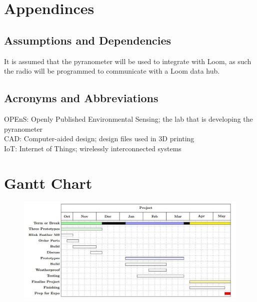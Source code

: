\documentclass[10pt,draftclsnofoot,onecolumn,letterpaper]{article}
\begin{document}
\section{Appendinces}
\subsection{Assumptions and Dependencies}
It is assumed that the pyranometer will be used to integrate with Loom, as such the radio will be programmed to communicate with a Loom data hub.

\subsection{Acronyms and Abbreviations}
OPEnS: Openly Published Environmental Sensing; the lab that is developing the pyranometer\\CAD: Computer-aided design; design files used in 3D printing\\IoT: Internet of Things; wirelessly interconnected systems

\pagebreak

\section{Gantt Chart}

\begin{figure}[h]
    \centering
    \includegraphics{ganttchart}
\end{figure}
\end{document}
